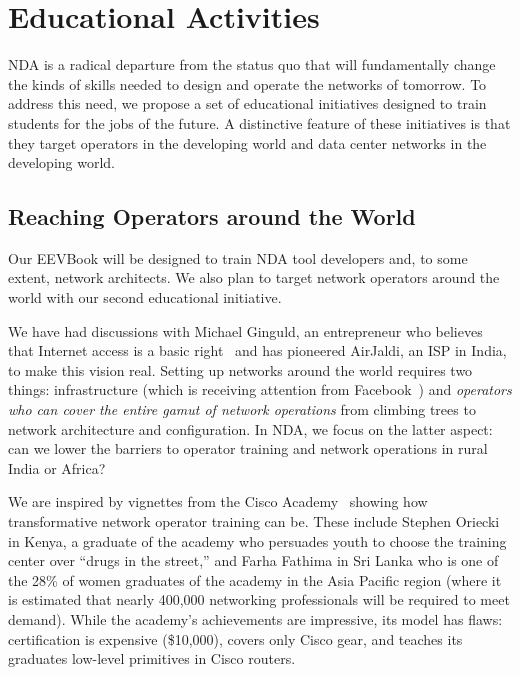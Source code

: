 \section{Educational Activities}

NDA is a radical departure from the status quo that will fundamentally change the kinds of skills needed to design and operate the networks of tomorrow. To address this need, we propose a set of educational initiatives designed to train students for the jobs of the future. A distinctive feature of these initiatives is that they target operators in the developing world and data center networks in the developing world.


\subsection{Reaching Operators around the World}
\label{operatoreducationsection}

Our EEVBook will be designed to train NDA tool developers and, to some extent, network architects. We also plan to target network operators around the world with our second educational initiative. 

We have had discussions with Michael Ginguld, an entrepreneur who believes that Internet access is a basic right~\cite{ginguld} and has pioneered AirJaldi, an ISP in India, to make this vision real. Setting up networks around the world requires two things: infrastructure (which is receiving attention from Facebook~\cite{facebookworld}) and {\em  operators who can cover the entire gamut of network operations} from climbing trees to network architecture and configuration. In NDA, we focus on the latter aspect: can we lower the barriers to operator training and network operations in rural India or Africa?

We are inspired by vignettes from the Cisco Academy~\cite{ciscoacademy} showing how transformative network
operator training can be. These include Stephen Oriecki in Kenya, a graduate of the academy who persuades youth to choose the training center over ``drugs in the street,'' and Farha Fathima in Sri Lanka who is one of the 28\% of women graduates of the academy in the Asia Pacific region (where it is estimated that nearly 400,000 networking professionals will be required to meet demand). While the academy's achievements are impressive, its model has flaws: certification is expensive (\$10,000), covers only Cisco gear, and teaches its graduates low-level primitives in Cisco routers.

